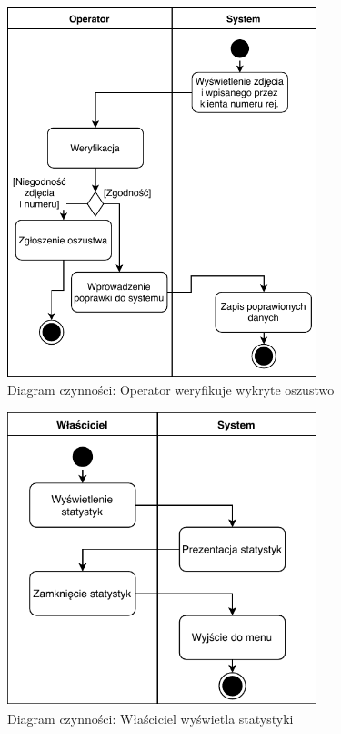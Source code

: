 \begin{figure}[H]
	\centering
	\includegraphics[width=90mm]{diagramy/DiagCzynWyswietlZdjecia.pdf}
	\caption{Diagram czynności: Operator weryfikuje wykryte oszustwo \label{overflow}}
\end{figure}

\begin{figure}[H]
	\centering
	\includegraphics[width=90mm]{diagramy/DiagCzynStatystyki.pdf}
	\caption{Diagram czynności: Właściciel wyświetla statystyki \label{overflow}}
\end{figure}




